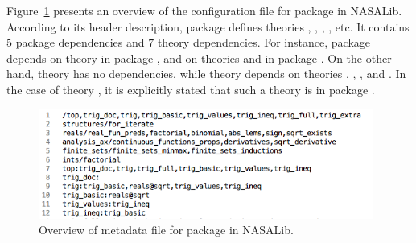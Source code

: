 Figure~\ref{fig.top} presents an overview of the configuration file
for package  in NASALib. According to its header
description, package  defines theories ,
, , , etc. It contains $5$
package dependencies and $7$ theory dependencies. For instance,
package  depends on theory  in package
, and on theories  and
 in package . On the
other hand, theory  has no dependencies, while theory
 depends on theories , ,
, and . In the case of theory
, it is explicitly stated that such a theory is in package
.

\begin{figure}
  \centering
  \includegraphics[width=11cm]{images/top.png}
  \caption{Overview of metadata file for package  in NASALib.}
  \label{fig.top}
\end{figure}
